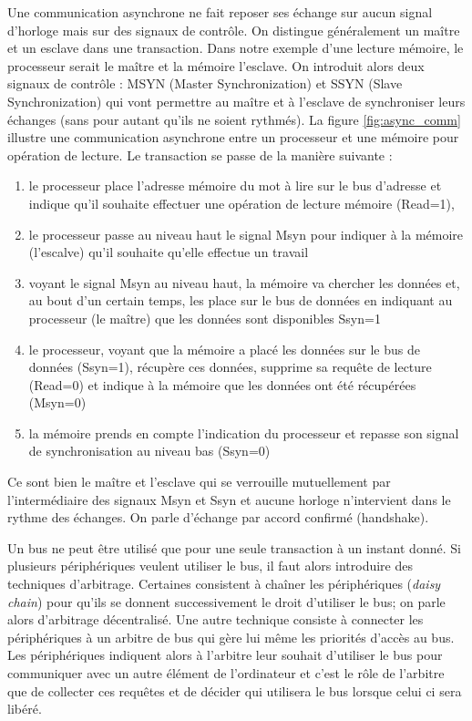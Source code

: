 Une communication asynchrone ne fait reposer ses échange sur aucun signal d'horloge mais sur des signaux de contrôle. On distingue généralement un maître et un esclave dans une transaction. Dans notre exemple d'une lecture mémoire, le processeur serait le maître et la mémoire l'esclave. On introduit alors deux signaux de contrôle : MSYN (Master Synchronization) et SSYN (Slave Synchronization) qui vont permettre au maître et à l'esclave de synchroniser leurs échanges (sans pour autant qu'ils ne soient rythmés). La figure \ref{fig:async_comm} illustre une communication asynchrone entre un processeur et une mémoire pour opération de lecture. Le transaction se passe de la manière suivante :
\begin{enumerate}
\item le processeur place l'adresse mémoire du mot à lire sur le bus d'adresse et indique qu'il souhaite effectuer une opération de lecture mémoire (Read=1),
\item le processeur passe au niveau haut le signal Msyn pour indiquer à la mémoire (l'escalve) qu'il souhaite qu'elle effectue un travail
\item voyant le signal Msyn au niveau haut, la mémoire va chercher les données et, au bout d'un certain temps, les place sur le bus de données en indiquant au processeur (le maître) que les données sont disponibles Ssyn=1
\item le processeur, voyant que la mémoire a placé les données sur le bus de données (Ssyn=1), récupère ces données, supprime sa requête de lecture (Read=0) et indique à la mémoire que les données ont été récupérées (Msyn=0)
\item la mémoire prends en compte l'indication du processeur et repasse son signal de synchronisation au niveau bas (Ssyn=0)
\end{enumerate}

Ce sont bien le maître et l'esclave qui se verrouille mutuellement par l'intermédiaire des signaux Msyn et Ssyn et aucune horloge n'intervient dans le rythme des échanges. On parle d'échange par accord confirmé (handshake).

Un bus ne peut être utilisé que pour une seule transaction à un instant donné. Si plusieurs périphériques veulent utiliser le bus, il faut alors introduire des techniques d'arbitrage. Certaines consistent à chaîner les périphériques (\emph{daisy chain}) pour qu'ils se donnent successivement le droit d'utiliser le bus; on parle alors d'arbitrage décentralisé. Une autre technique consiste à connecter les périphériques à un arbitre de bus qui gère lui même les priorités d'accès au bus. Les périphériques indiquent alors à l'arbitre leur souhait d'utiliser le bus pour communiquer avec un autre élément de l'ordinateur et c'est le rôle de l'arbitre que de collecter ces requêtes et de décider qui utilisera le bus lorsque celui ci sera libéré.


